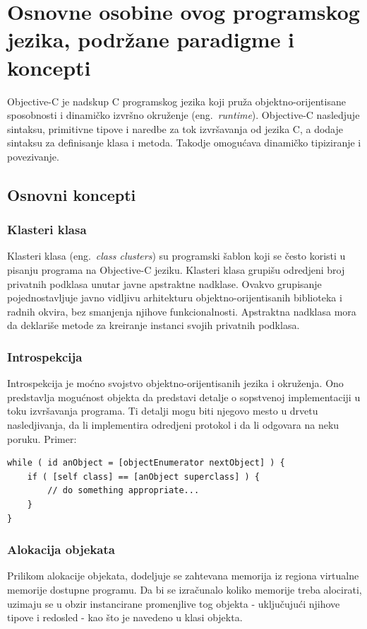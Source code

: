 \documentclass[a4paper]{article}
\begin{document}
{\section{Osnovne osobine ovog programskog jezika, podržane paradigme i koncepti}
\label{sec:osobine}
Objective-C je nadskup C programskog jezika koji pruža objektno-orijentisane sposobnosti i dinamičko izvršno okruženje (eng.~{\em runtime}). Objective-C nasledjuje sintaksu, primitivne tipove i naredbe za tok izvršavanja od jezika C, a dodaje sintaksu za definisanje klasa i metoda. Takodje omogućava dinamičko tipiziranje i povezivanje.
\subsection{Osnovni koncepti}
\subsubsection{Klasteri klasa}
Klasteri klasa (eng.~{\em class clusters}) su programski šablon koji se često koristi u pisanju programa na Objective-C jeziku. Klasteri klasa grupišu odredjeni broj privatnih podklasa unutar javne apstraktne nadklase. 
Ovakvo grupisanje pojednostavljuje javno vidljivu arhitekturu objektno-orijentisanih biblioteka i radnih okvira, bez smanjenja njihove funkcionalnosti. Apstraktna nadklasa mora da deklariše metode za kreiranje instanci svojih privatnih podklasa. 
\subsubsection{Introspekcija}
Introspekcija je moćno svojstvo objektno-orijentisanih jezika i okruženja. Ono predstavlja mogućnost objekta da predstavi detalje o sopstvenoj implementaciji u toku izvršavanja programa. Ti detalji mogu biti njegovo mesto u drvetu nasledjivanja, da li implementira odredjeni protokol i da li odgovara na neku poruku. Primer: 
\begin{lstlisting}[frame=single]
while ( id anObject = [objectEnumerator nextObject] ) {
    if ( [self class] == [anObject superclass] ) {
        // do something appropriate...
    }
}
\end{lstlisting}
\subsubsection{Alokacija objekata}
Prilikom alokacije objekata, dodeljuje se zahtevana memorija iz regiona virtualne memorije dostupne programu. Da bi se izračunalo koliko memorije treba alocirati, uzimaju se u obzir instancirane promenjlive tog objekta - uključujući njihove tipove i redosled - kao što je navedeno u klasi objekta.

}
\end{document}
